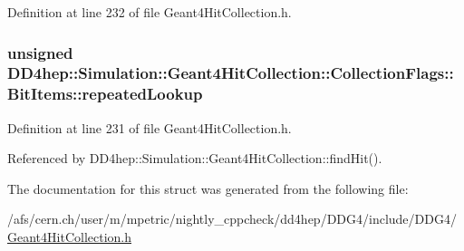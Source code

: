 Definition at line 232 of file Geant4HitCollection.h.\hypertarget{struct_d_d4hep_1_1_simulation_1_1_geant4_hit_collection_1_1_collection_flags_1_1_bit_items_af334712a202c01ad71ea6578067ef3f7}{
\subsubsection[{repeatedLookup}]{\setlength{\rightskip}{0pt plus 5cm}unsigned {\bf DD4hep::Simulation::Geant4HitCollection::CollectionFlags::BitItems::repeatedLookup}}}
\label{struct_d_d4hep_1_1_simulation_1_1_geant4_hit_collection_1_1_collection_flags_1_1_bit_items_af334712a202c01ad71ea6578067ef3f7}


Definition at line 231 of file Geant4HitCollection.h.

Referenced by DD4hep::Simulation::Geant4HitCollection::findHit().

The documentation for this struct was generated from the following file:\begin{DoxyCompactItemize}
\item 
/afs/cern.ch/user/m/mpetric/nightly\_\-cppcheck/dd4hep/DDG4/include/DDG4/\hyperlink{_geant4_hit_collection_8h}{Geant4HitCollection.h}\end{DoxyCompactItemize}
